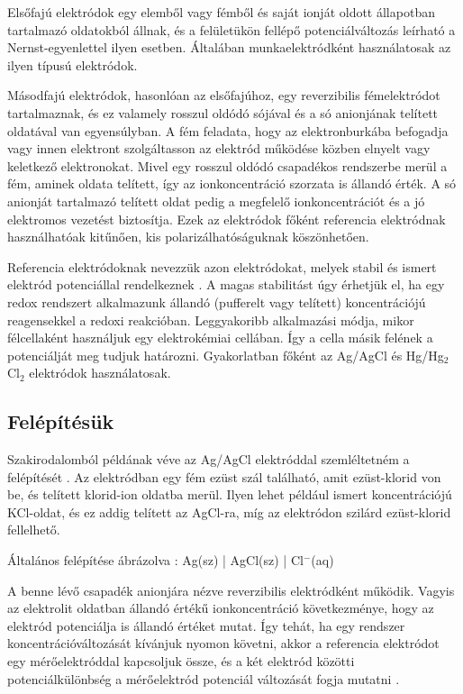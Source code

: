 Elsőfajú elektródok egy elemből vagy fémből és saját ionját oldott állapotban tartalmazó oldatokból állnak, és a felületükön fellépő potenciálváltozás leírható a Nernst-egyenlettel ilyen esetben. Általában munkaelektródként használatosak az ilyen típusú elektródok.

Másodfajú elektródok, hasonlóan az elsőfajúhoz, egy reverzibilis fémelektródot tartalmaznak, és ez valamely rosszul oldódó sójával és a só anionjának telített oldatával van egyensúlyban. A fém feladata, hogy az elektronburkába befogadja vagy innen elektront szolgáltasson az elektród működése közben elnyelt vagy keletkező elektronokat. Mivel egy rosszul oldódó csapadékos rendszerbe merül a fém, aminek oldata telített, így az ionkoncentráció szorzata is állandó érték. A só anionját tartalmazó telített oldat pedig a megfelelő ionkoncentrációt és a jó elektromos vezetést biztosítja. Ezek az elektródok főként referencia elektródnak használhatóak kitűnően, kis polarizálhatóságuknak köszönhetően.

Referencia elektródoknak nevezzük azon elektródokat, melyek stabil és ismert elektród potenciállal rendelkeznek \cite{allen2001electrochemical}. A magas stabilitást úgy érhetjük el, ha egy redox rendszert alkalmazunk állandó (pufferelt vagy telített) koncentrációjú reagensekkel a redoxi reakcióban. Leggyakoribb alkalmazási módja, mikor félcellaként használjuk egy elektrokémiai cellában. Így a cella másik felének a potenciálját meg tudjuk határozni. Gyakorlatban főként az Ag/AgCl és Hg/Hg$_2$Cl$_2$ elektródok használatosak. 

\subsection{Felépítésük}

Szakirodalomból példának véve az Ag/AgCl elektróddal szemléltetném a felépítését \cite{janz1968silver}. Az elektródban egy fém ezüst szál található, amit ezüst-klorid von be, és telített klorid-ion oldatba merül. Ilyen lehet például ismert koncentrációjú KCl-oldat, és ez addig telített az AgCl-ra, míg az elektródon szilárd ezüst-klorid fellelhető.


Általános felépítése ábrázolva : Ag(sz) | AgCl(sz) | Cl$^-$(aq)


A benne lévő csapadék anionjára nézve reverzibilis elektródként működik. Vagyis az elektrolit oldatban állandó értékű ionkoncentráció következménye, hogy az elektród potenciálja is állandó értéket mutat. Így tehát, ha egy rendszer koncentrációváltozását kívánjuk nyomon követni, akkor a referencia elektródot egy mérőelektróddal kapcsoljuk össze, és a két elektród közötti potenciálkülönbség a mérőelektród potenciál változását fogja mutatni \cite{harrisquantitative}.

